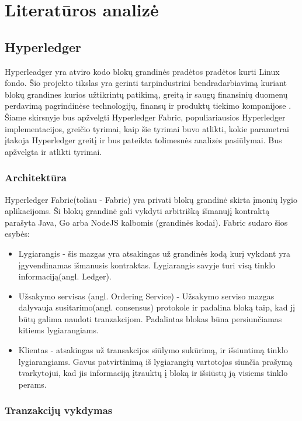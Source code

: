 \documentclass{VUMIFPSkursinis}
\begin{document}
\section{Literatūros analizė}
	\subsection{Hyperledger}
		Hyperleadger yra atviro kodo blokų grandinės pradėtos pradėtos kurti Linux fondo. Šio projekto tikslas yra gerinti tarpindustrini bendradarbiavimą kuriant blokų grandines kurios užtikrintų 
		patikimą, greitą ir saugų finansinių duomenų perdavimą pagrindinėse technologijų, finansų ir produktų tiekimo kompanijose \cite{LinuxHyper}. Šiame skirsnyje bus apžvelgti 
		Hyperledger Fabric, populiariausios Hyperledger implementacijos, greičio tyrimai, kaip šie tyrimai buvo atlikti, kokie parametrai įtakoja Hyperledger greitį ir bus pateikta tolimesnės analizės pasiūlymai. Bus apžvelgta \cite{ThailandPerf} ir \cite{IMBResearch} atlikti tyrimai.
		
		\subsubsection{Architektūra}
			Hyperledger Fabric(toliau - Fabric) yra privati blokų grandinė skirta įmonių lygio aplikacijoms. 
			Ši blokų grandinė gali vykdyti arbitrišką išmanujį kontraktą parašyta Java, Go arba NodeJS kalbomis (grandinės kodai).
			Fabric sudaro šios esybės:
			\begin{itemize}
				\item{Lygiarangis - šis mazgas yra atsakingas už grandinės kodą kurį vykdant yra įgyvendinamas išmanusis kontraktas. 
 Lygiarangis savyje turi visą tinklo informaciją(angl. Ledger). }
				\item{Užsakymo servisas (angl. Ordering Service) - Užsakymo serviso mazgas dalyvauja susitarimo(angl. consensus) 
protokole ir padalina bloką taip, kad jį būtų galima naudoti tranzakcijom. Padalintas blokas būna persiunčiamas kitiems lygiarangiams.}
				\item{Klientas - atsakingas už transakcijos siūlymo sukūrimą, ir išsiuntimą tinklo lygiarangiams. Gavus patvirtinimą iš lygiarangių vartotojas siunčia prašymą tvarkytojui, kad jis informaciją įtrauktų į bloką ir išsiūstų ją visiems tinklo perams.}
			\end{itemize}

		\subsubsection{Tranzakcijų vykdymas}
\end{document}
